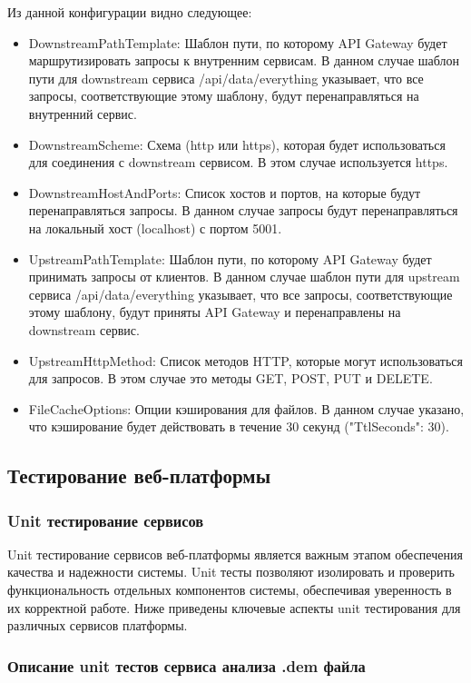 Из данной конфигурации видно следующее:

\begin{itemize}
	\item DownstreamPathTemplate: Шаблон пути, по которому API Gateway будет маршрутизировать запросы к внутренним сервисам. В данном случае шаблон пути для downstream сервиса /api/data/{everything} указывает, что все запросы, соответствующие этому шаблону, будут перенаправляться на внутренний сервис.
	\item DownstreamScheme: Схема (http или https), которая будет использоваться для соединения с downstream сервисом. В этом случае используется https.
	\item DownstreamHostAndPorts: Список хостов и портов, на которые будут перенаправляться запросы. В данном случае запросы будут перенаправляться на локальный хост (localhost) с портом 5001.
	\item UpstreamPathTemplate: Шаблон пути, по которому API Gateway будет принимать запросы от клиентов. В данном случае шаблон пути для upstream сервиса /api/data/{everything} указывает, что все запросы, соответствующие этому шаблону, будут приняты API Gateway и перенаправлены на downstream сервис.
	\item UpstreamHttpMethod: Список методов HTTP, которые могут использоваться для запросов. В этом случае это методы GET, POST, PUT и DELETE.
	\item FileCacheOptions: Опции кэширования для файлов. В данном случае указано, что кэширование будет действовать в течение 30 секунд ("TtlSeconds": 30).
\end{itemize}

\subsection{Тестирование веб-платформы}

\subsubsection{Unit тестирование сервисов}

Unit тестирование сервисов веб-платформы является важным этапом обеспечения качества и надежности системы. Unit тесты позволяют изолировать и проверить функциональность отдельных компонентов системы, обеспечивая уверенность в их корректной работе. Ниже приведены ключевые аспекты unit тестирования для различных сервисов платформы.

\subsubsection{Описание unit тестов сервиса анализа .dem файла}

